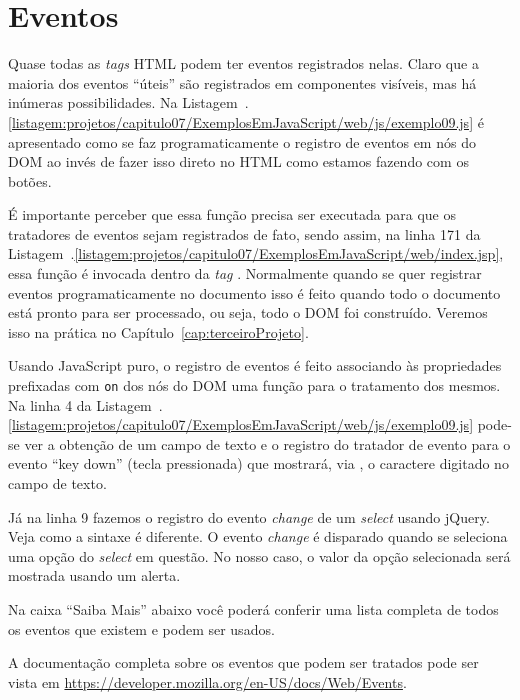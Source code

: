 \section{Eventos}

Quase todas as \textit{tags} HTML podem ter eventos registrados nelas. Claro que a maioria dos eventos ``úteis'' são registrados em componentes visíveis, mas há inúmeras possibilidades. Na Listagem~\thechapter.\ref{listagem:projetos/capitulo07/ExemplosEmJavaScript/web/js/exemplo09.js} é apresentado como se faz programaticamente o registro de eventos em nós do DOM ao invés de fazer isso direto no HTML como estamos fazendo com os botões.


É importante perceber que essa função precisa ser executada para que os tratadores de eventos sejam registrados de fato, sendo assim, na linha 171 da Listagem~\thechapter.\ref{listagem:projetos/capitulo07/ExemplosEmJavaScript/web/index.jsp}, essa função é invocada dentro da \textit{tag} . Normalmente quando se quer registrar eventos programaticamente no documento isso é feito quando todo o documento está pronto para ser processado, ou seja, todo o DOM foi construído. Veremos isso na prática no Capítulo~\ref{cap:terceiroProjeto}.

Usando JavaScript puro, o registro de eventos é feito associando às propriedades prefixadas com \texttt{on} dos nós do DOM uma função para o tratamento dos mesmos. Na linha 4 da Listagem~\thechapter.\ref{listagem:projetos/capitulo07/ExemplosEmJavaScript/web/js/exemplo09.js} pode-se ver a obtenção de um campo de texto e o registro do tratador de evento para o evento ``key down'' (tecla pressionada) que mostrará, via , o caractere digitado no campo de texto.

Já na linha 9 fazemos o registro do evento \textit{change} de um \textit{select} usando jQuery. Veja como a sintaxe é diferente. O evento \textit{change} é disparado quando se seleciona uma opção do \textit{select} em questão. No nosso caso, o valor da opção selecionada será mostrada usando um alerta.

Na caixa ``Saiba Mais'' abaixo você poderá conferir uma lista completa de todos os eventos que existem e podem ser usados.

\begin{saibaMais}
    A documentação completa sobre os eventos que podem ser tratados pode ser vista em  \url{https://developer.mozilla.org/en-US/docs/Web/Events}.
\end{saibaMais}




